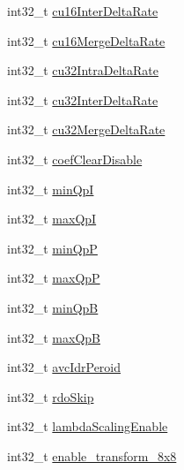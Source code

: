 \begin{DoxyCompactItemize}
\item 
int32\+\_\+t \mbox{\hyperlink{struct__ni__t408__config__t_a160aa52131cb8c9369f6ae69c4863331}{cu16\+Inter\+Delta\+Rate}}
\item 
int32\+\_\+t \mbox{\hyperlink{struct__ni__t408__config__t_aa2779a8e49347db08ae257ddfaeab8b4}{cu16\+Merge\+Delta\+Rate}}
\item 
int32\+\_\+t \mbox{\hyperlink{struct__ni__t408__config__t_aecf1c88ecf0954ef453228b26378e054}{cu32\+Intra\+Delta\+Rate}}
\item 
int32\+\_\+t \mbox{\hyperlink{struct__ni__t408__config__t_a73b4b9d53c5098de3166b2ff0b394549}{cu32\+Inter\+Delta\+Rate}}
\item 
int32\+\_\+t \mbox{\hyperlink{struct__ni__t408__config__t_aa143605a2c305b7e9279e09b4cf2df2c}{cu32\+Merge\+Delta\+Rate}}
\item 
int32\+\_\+t \mbox{\hyperlink{struct__ni__t408__config__t_a151adce8649da863c632b68124743c22}{coef\+Clear\+Disable}}
\item 
int32\+\_\+t \mbox{\hyperlink{struct__ni__t408__config__t_ac4954d3d19a69e29f4ce3a0aca301f84}{min\+QpI}}
\item 
int32\+\_\+t \mbox{\hyperlink{struct__ni__t408__config__t_a874c189279f65854f52101c60f2956fb}{max\+QpI}}
\item 
int32\+\_\+t \mbox{\hyperlink{struct__ni__t408__config__t_ab2c629d90fa0cd4417eb55353c422b8a}{min\+QpP}}
\item 
int32\+\_\+t \mbox{\hyperlink{struct__ni__t408__config__t_aa26ebcac91a981e85d08fca531c2975c}{max\+QpP}}
\item 
int32\+\_\+t \mbox{\hyperlink{struct__ni__t408__config__t_adbcc0c8e422026d9a1d4597b3fc7cfc3}{min\+QpB}}
\item 
int32\+\_\+t \mbox{\hyperlink{struct__ni__t408__config__t_a13faeb393a1c1e4aa154405bb5abb059}{max\+QpB}}
\item 
int32\+\_\+t \mbox{\hyperlink{struct__ni__t408__config__t_ab718d3584a122f4440fcc2acf3268609}{avc\+Idr\+Peroid}}
\item 
int32\+\_\+t \mbox{\hyperlink{struct__ni__t408__config__t_afac86fae56eb3c1b9a8128788d236bc1}{rdo\+Skip}}
\item 
int32\+\_\+t \mbox{\hyperlink{struct__ni__t408__config__t_a06f108e2fef1adb2027b28792be9740b}{lambda\+Scaling\+Enable}}
\item 
int32\+\_\+t \mbox{\hyperlink{struct__ni__t408__config__t_a9a7bf588d05dcf940cd2325f80a9299a}{enable\+\_\+transform\+\_\+8x8}}
\item 

\end{DoxyCompactItemize}

